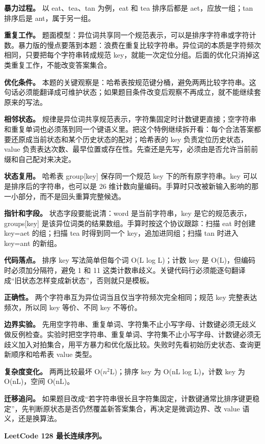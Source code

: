 \textbf{暴力过程。} 以 eat、tea、tan 为例，eat 和 tea 排序后都是 aet，应放一组；tan 排序后是 ant，属于另一组。

\textbf{重复工作。} 题面模型：异位词共享同一个规范表示，可以是排序字符串或字符计数。暴力版的慢点要落到本题：浪费在重复比较字符串。异位词的本质是字符频次相同，只要把每个字符串转成规范 key，就能一次定位分组。后面的优化只消掉这类重复工作，不能改变答案集合。

\textbf{优化条件。} 本题的关键观察是：哈希表按规范键分桶，避免两两比较字符串。这句话必须能翻译成可维护状态；如果题目条件改变后观察不再成立，就不能继续套原来的写法。

\textbf{相邻状态。} 规律是异位词共享规范表示，字符集固定时计数键更直接；空字符串和重复单词也必须落到同一个键语义里。把这个特例继续拆开看：每个合法答案都要还原成当前状态和某个历史状态的配对；哈希表的 key 负责定位历史状态，value 负责表达次数、最早位置或存在性。先查还是先写，必须由是否允许当前前缀和自己配对来决定。

\textbf{状态复用。} 哈希表 group[key] 保存同一个规范 key 下的所有原字符串。key 可以是排序后的字符串，也可以是 26 维计数向量编码。手算时只改被新输入影响的那一小部分，而不是回头重算完整候选。

\textbf{指针和字段。} 状态字段要能说清：word 是当前字符串，key 是它的规范表示，groups[key] 是该异位词类的结果数组。手算时按这个协议跟踪：扫描 eat 时创建 key=aet 的组；扫描 tea 时得到同一个 key，追加进同组；扫描 tan 时进入 key=ant 的新组。

\textbf{代码落点。} 排序 key 写法简单但每个词 O(L log L)；计数 key 是 O(L)，但编码时必须加分隔符，避免 1 和 11 这类计数串歧义。关键代码行必须能逐句翻译成“旧状态怎样变成新状态”，否则就只是模板。

\textbf{正确性。} 两个字符串互为异位词当且仅当字符频次完全相同；规范 key 完整表达频次，所以同 key 等价、不同 key 不等价。

\textbf{边界实验。} 先用空字符串、重复单词、字符集不止小写字母、计数键必须无歧义做反例检查。实验时把空字符串、重复单词、字符集不止小写字母、计数键必须无歧义加入对拍集合，用平方暴力和优化版比较。失败时先看初始历史状态、查询更新顺序和哈希表 value 类型。

\textbf{复杂度变化。} 两两比较最坏 O(\ensuremath{n^{2}}L)；排序 key 为 O(nL log L)，计数 key 为 O(nL)，空间 O(nL)。

\textbf{迁移追问。} 如果题目改成“若字符串很长且字符集固定，计数键通常比排序键更稳定”，先判断原状态是否仍然覆盖新答案集合，再决定是微调边界、改 value 语义，还是换算法。

\noindent\textbf{LeetCode 128 最长连续序列。}

